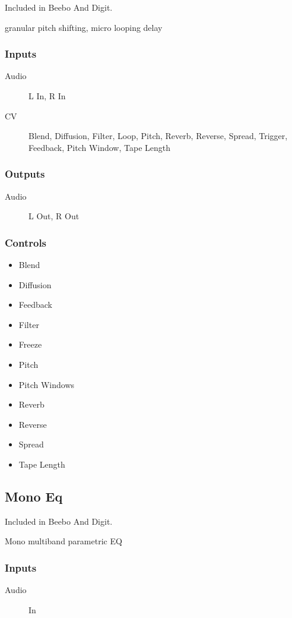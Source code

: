 Included in Beebo And Digit.

granular pitch shifting, micro looping delay



\subsubsection{Inputs}
\begin{description}
\item [Audio] L In, R In
\item [CV] Blend, Diffusion, Filter, Loop, Pitch, Reverb, Reverse, Spread, Trigger, Feedback, Pitch Window, Tape Length
\end{description}

\subsubsection{Outputs}
\begin{description}
\item [Audio] L Out, R Out
\end{description}

\subsubsection{Controls}
\begin{itemize}
\item Blend
\item Diffusion
\item Feedback
\item Filter
\item Freeze
\item Pitch
\item Pitch Windows
\item Reverb
\item Reverse
\item Spread
\item Tape Length
\end{itemize}

\subsection{Mono Eq}

Included in Beebo And Digit.

Mono multiband parametric EQ



\subsubsection{Inputs}
\begin{description}
\item [Audio] In
\end{description}

